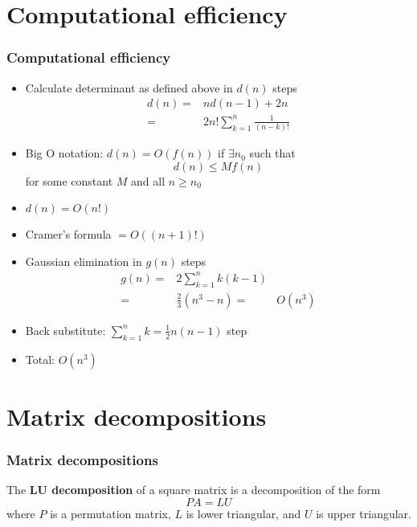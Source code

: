 \documentclass[compress]{beamer}
\begin{document}
\section{Computational efficiency}

\begin{frame}
  \frametitle{Computational efficiency}
  \begin{itemize}
  \item Calculate determinant as defined above in $d(n)$ steps
    \begin{align*}
      d(n) = & n d(n-1) + 2n  \\
      = & 2n! \sum_{k=1}^n \frac{1}{(n-k)!} 
    \end{align*}
  \item Big O notation: $d(n) = O(f(n))$ if $\exists n_0$ such
    that
    \[
    d(n) \leq M f(n) 
    \]
    for some constant $M$ and all $n \geq n_0$
  \item $d(n) = O(n!)$
  \item Cramer's formula $=O((n+1)!)$
  \end{itemize}
  
\end{frame}

\begin{frame}
  \begin{itemize}
  \item Gaussian elimination in $g(n)$ steps
    \begin{align*}
      g(n) = & 2 \sum_{k=1}^n k(k-1) \\
      = & \frac{2}{3} (n^3 - n)
      = & O(n^3)
    \end{align*}
  \item Back substitute: $\sum_{k=1}^n k = \frac{1}{2}
    n(n-1)$ step
  \item Total: $O(n^3)$
  \end{itemize}  
\end{frame}

\section{Matrix decompositions}
\begin{frame}
  \frametitle{Matrix decompositions}
  \begin{definition}
    The \textbf{LU decomposition} of a square matrix is a decomposition
    of the form
    \[ P A = L U \]
    where $P$ is a permutation matrix, $L$ is lower triangular, and $U$
    is upper triangular. 
  \end{definition}
\end{frame}
\end{document}
